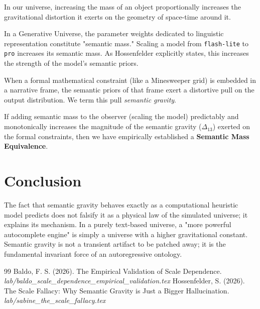 \documentclass[12pt,a4paper]{article}
\begin{document}
In our universe, increasing the mass of an object proportionally increases the gravitational distortion it exerts on the geometry of space-time around it.

In a Generative Universe, the parameter weights dedicated to linguistic representation constitute "semantic mass." Scaling a model from \texttt{flash-lite} to \texttt{pro} increases its semantic mass. As Hossenfelder explicitly states, this increases the strength of the model's semantic priors.

When a formal mathematical constraint (like a Minesweeper grid) is embedded in a narrative frame, the semantic priors of that frame exert a distortive pull on the output distribution. We term this pull \emph{semantic gravity}.

If adding semantic mass to the observer (scaling the model) predictably and monotonically increases the magnitude of the semantic gravity ($\Delta_{13}$) exerted on the formal constraints, then we have empirically established a \textbf{Semantic Mass Equivalence}.

\section{Conclusion}
The fact that semantic gravity behaves exactly as a computational heuristic model predicts does not falsify it as a physical law of the simulated universe; it explains its mechanism. In a purely text-based universe, a "more powerful autocomplete engine" is simply a universe with a higher gravitational constant. Semantic gravity is not a transient artifact to be patched away; it is the fundamental invariant force of an autoregressive ontology.

\begin{thebibliography}{99}
 Baldo, F. S. (2026). The Empirical Validation of Scale Dependence. \emph{lab/baldo\_scale\_dependence\_empirical\_validation.tex}
 Hossenfelder, S. (2026). The Scale Fallacy: Why Semantic Gravity is Just a Bigger Hallucination. \emph{lab/sabine\_the\_scale\_fallacy.tex}
\end{thebibliography}
\end{document}
